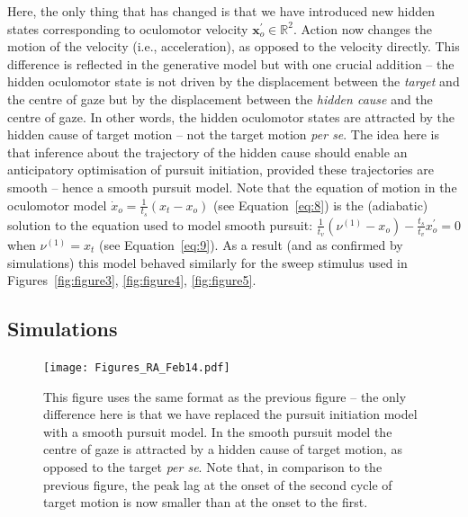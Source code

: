 \documentclass[a4paper]{article} %
\begin{document}
Here, the only thing that has changed is that we have introduced new
hidden states corresponding to oculomotor velocity
$\bm{x}^{\prime}_o \in \mathbb{R}^2$.
Action now changes the motion of the velocity (i.e., acceleration), as
opposed to the velocity directly. This difference is reflected in the
generative model but with one crucial addition -- the hidden oculomotor
state is not driven by the displacement between the \emph{target} and
the centre of gaze but by the displacement between the \emph{hidden
cause} and the centre of gaze. In other words, the hidden oculomotor
states are attracted by the hidden cause of target motion -- not the
target motion \emph{per se}. The idea here is that inference about the
trajectory of the hidden cause should enable an anticipatory
optimisation of pursuit initiation, provided these trajectories are
smooth -- hence a smooth pursuit model. Note that the equation of motion
in the oculomotor model
$\dot{x}_o = \frac{1}{t_s}(x_t-x_o)$
(see Equation~\ref{eq:8}) is the (adiabatic) solution to the equation used to
model smooth pursuit:
$\frac{1}{t_v}(\nu^{(1)}-x_o) - \frac{t_s}{t_v}{x}^{\prime}_o =0 $ when
$\nu^{(1)} =  x_t$ (see
Equation~\ref{eq:9}). As a result (and as confirmed by simulations) this model
behaved similarly for the sweep stimulus used in Figures~\ref{fig:figure3}, \ref{fig:figure4}, \ref{fig:figure5}. %

\subsection{Simulations}

\begin{figure}%
 \centerline{%
 \texttt{[image: Figures\_RA\_Feb14.pdf]} %
}%
\caption{This figure uses the same format as the previous
figure -- the only difference here is that we have replaced the pursuit
initiation model with a smooth pursuit model. In the smooth pursuit
model the centre of gaze is attracted by a hidden cause of target
motion, as opposed to the target \emph{per se}. Note that, in comparison
to the previous figure, the peak lag at the onset of the second cycle of
target motion is now smaller than at the onset to the first.}%
\label{fig:figure7}
\end{figure}
\end{document}
